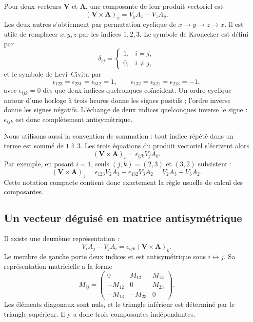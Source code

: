 Pour deux vecteurs \(\mathbf V\) et \(\mathbf A\), une composante de leur produit vectoriel est
\begin{equation}
  (\mathbf V\times\mathbf A)_x
  =
  V_yA_z-V_zA_y.
\end{equation}
Les deux autres s’obtiennent par permutation cyclique de \(x\to y\to z\to x\). Il est utile de remplacer \(x,y,z\) par les indices \(1,2,3\). Le symbole de Kronecker est défini par
\begin{equation}
  \delta_{ij}
  =
  \begin{cases}
    1,&i=j,\\
    0,&i\ne j,
  \end{cases}
\end{equation}
et le symbole de Levi--Civita par
\begin{equation}
  \epsilon_{123}=\epsilon_{231}=\epsilon_{312}=1,
  \qquad
  \epsilon_{132}=\epsilon_{321}=\epsilon_{213}=-1,
\end{equation}
avec \(\epsilon_{ijk}=0\) dès que deux indices quelconques coïncident. Un ordre cyclique autour d’une horloge à trois heures donne les signes positifs ; l’ordre inverse donne les signes négatifs. L’échange de deux indices quelconques inverse le signe : \(\epsilon_{ijk}\) est donc complètement antisymétrique.

Nous utilisons aussi la convention de sommation : tout indice répété dans un terme est sommé de \(1\) à \(3\). Les trois équations du produit vectoriel s’écrivent alors
\begin{equation}
  (\mathbf V\times\mathbf A)_i
  =
  \epsilon_{ijk}V_jA_k.
\end{equation}
Par exemple, en posant \(i=1\), seuls \((j,k)=(2,3)\) et \((3,2)\) subsistent :
\begin{equation}
  (\mathbf V\times\mathbf A)_1
  =
  \epsilon_{123}V_2A_3
  +\epsilon_{132}V_3A_2
  =
  V_2A_3-V_3A_2.
\end{equation}
Cette notation compacte contient donc exactement la règle usuelle de calcul des composantes.

\subsection{Un vecteur déguisé en matrice antisymétrique}

Il existe une deuxième représentation :
\begin{equation}
  V_iA_j-V_jA_i
  =
  \epsilon_{ijk}(\mathbf V\times\mathbf A)_k.
\end{equation}
Le membre de gauche porte deux indices et est antisymétrique sous \(i\leftrightarrow j\). Sa représentation matricielle a la forme
\begin{equation}
  M_{ij}
  =
  \begin{pmatrix}
    0&M_{12}&M_{13}\\
    -M_{12}&0&M_{23}\\
    -M_{13}&-M_{23}&0
  \end{pmatrix}.
\end{equation}
Les éléments diagonaux sont nuls, et le triangle inférieur est déterminé par le triangle supérieur. Il y a donc trois composantes indépendantes.

